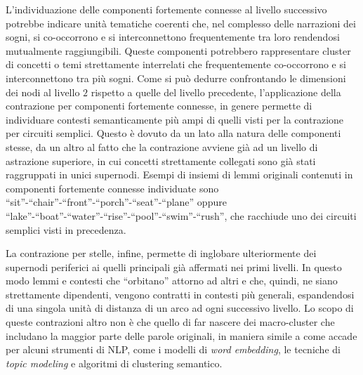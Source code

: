 L'individuazione delle componenti fortemente connesse al livello successivo potrebbe indicare unità tematiche coerenti
che, nel complesso delle narrazioni dei sogni, si co-occorrono e si interconnettono frequentemente tra loro rendendosi
mutualmente raggiungibili.
Queste componenti potrebbero rappresentare cluster di concetti o temi strettamente
interrelati che frequentemente co-occorrono e si interconnettono tra più sogni.
Come si può dedurre confrontando le dimensioni dei nodi al livello $2$ rispetto a quelle del livello precedente,
l'applicazione della contrazione per componenti fortemente connesse, in genere permette di individuare contesti
semanticamente più ampi di quelli visti per la contrazione per circuiti semplici.
Questo è dovuto da un lato alla natura delle componenti stesse, da un altro al fatto che la contrazione avviene
già ad un livello di astrazione superiore, in cui concetti strettamente collegati sono già stati raggruppati in unici
supernodi.
Esempi di insiemi di lemmi originali contenuti in componenti fortemente connesse individuate sono
``sit''-``chair''-``front''-``porch''-``seat''-``plane''
oppure ``lake''-``boat''-``water''-``rise''-``pool''-``swim''-``rush'', che racchiude uno dei circuiti semplici visti
in precedenza.

La contrazione per stelle, infine, permette di inglobare ulteriormente dei supernodi periferici ai quelli principali già
affermati nei primi livelli.
In questo modo lemmi e contesti che ``orbitano'' attorno ad altri e che, quindi,
ne siano strettamente dipendenti, vengono contratti in contesti più generali, espandendosi di una singola unità
di distanza di un arco ad ogni successivo livello.
Lo scopo di queste contrazioni altro non è che quello di far nascere dei macro-cluster che includano la maggior parte
delle parole originali, in maniera simile a come accade per alcuni strumenti di NLP, come i modelli di
\textit{word embedding}, le tecniche di \textit{topic modeling} e algoritmi di clustering semantico.